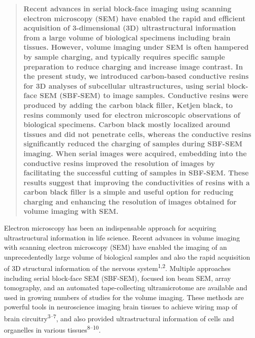 \documentclass{article}
\begin{document}
\begin{quote}
\textbf{Recent advances in serial block-face imaging using scanning electron microscopy (SEM) have enabled the rapid and efficient acquisition of 3-dimensional (3D) ultrastructural information from a large volume of biological specimens including brain tissues. However, volume imaging under SEM is often hampered by sample charging, and typically requires specific sample preparation to reduce charging and increase image contrast. In the present study, we introduced carbon-based conductive resins for 3D analyses of subcellular ultrastructures, using serial block-face SEM (SBF-SEM) to image samples. Conductive resins were produced by adding the carbon black filler, Ketjen black, to resins commonly used for electron microscopic observations of biological specimens. Carbon black mostly localized around tissues and did not penetrate cells, whereas the conductive resins significantly reduced the charging of samples during SBF-SEM imaging. When serial images were acquired, embedding into the conductive resins improved the resolution of images by facilitating the successful cutting of samples in SBF-SEM. These results suggest that improving the conductivities of resins with a carbon black filler is a simple and useful option for reducing charging and enhancing the resolution of images obtained for volume imaging with SEM.}
\end{quote}

Electron microscopy has been an indispensable approach for acquiring ultrastructural information in life science. Recent advances in volume imaging with scanning electron microscopy (SEM) have enabled the imaging of an unprecedentedly large volume of biological samples and also the rapid acquisition of 3D structural information of the nervous system\textsuperscript{1,2}. Multiple approaches including serial block-face SEM (SBF-SEM), focused ion beam SEM, array tomography, and an automated tape-collecting ultramicrotome are available and used in growing numbers of studies for the volume imaging. These methods are powerful tools in neuroscience imaging brain tissues to achieve wiring map of brain circuitry\textsuperscript{3–7}, and also provided ultrastructural information of cells and organelles in various tissues\textsuperscript{8–10}.
\end{document}
